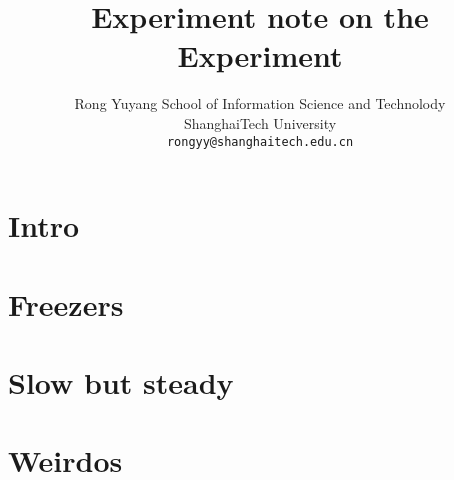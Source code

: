 \documentclass[10pt]{article}
\begin{document}
\title{
	Experiment note on the Experiment
}
\author{Rong Yuyang
School of Information Science and Technolody\\
ShanghaiTech University\\
{\tt\small rongyy@shanghaitech.edu.cn}
}
\maketitle

\section{Intro}

\section{Freezers}

\section{Slow but steady}

\section{Weirdos}
\end{document}
